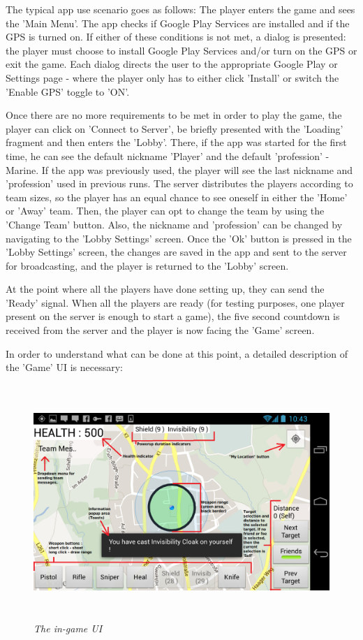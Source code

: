 The typical app use scenario goes as follows: The player enters the game and
sees the 'Main Menu'. The app checks if Google Play Services are installed and
if the GPS is turned on. If either of these conditions is not met, a dialog is
presented: the player must choose to install Google Play Services and/or turn on
the GPS or exit the game. Each dialog directs the user to the appropriate Google
Play or Settings page - where the player only has to either click 'Install' or
switch the 'Enable GPS' toggle to 'ON'.\newline

Once there are no more requirements to be met in order to play the game, the
player can click on 'Connect to Server', be briefly presented with the 'Loading'
fragment and then enters the 'Lobby'. There, if the app was started for the
first time, he can see the default nickname 'Player' and the default
'profession' - Marine. If the app was previously used, the player will see the
last nickname and 'profession' used in previous runs. The server distributes the
players according to team sizes, so the player has an equal chance to see
oneself in either the 'Home' or 'Away' team. Then, the player can opt to change
the team by using the 'Change Team' button. Also, the nickname and 'profession'
can be changed by navigating to the 'Lobby Settings' screen. Once the 'Ok'
button is pressed in the 'Lobby Settings' screen, the changes are saved in the
app and sent to the server for broadcasting, and the player is returned
to the 'Lobby' screen.\newline

At the point where all the players have done setting up, they can send the
'Ready' signal. When all the players are ready (for testing purposes, one
player present on the server is enough to start a game), the five second
countdown is received from the server and the player is now facing the 'Game'
screen.\newline

In order to understand what can be done at this point, a detailed description of
the 'Game' UI is necessary: \newline
 
\begin{figure}
\includegraphics[height=3.5in,width=6.23in]{./images/android_screenshots/tutorial_game.png}  
\caption{\small \sl The in-game UI \label{fig:game_ui}}
\end{figure}

